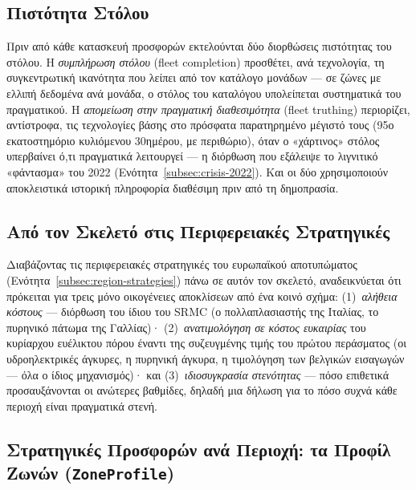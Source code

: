 \subsection{Πιστότητα Στόλου}
\label{subsec:fleet-honesty}

Πριν από κάθε κατασκευή προσφορών εκτελούνται δύο διορθώσεις πιστότητας του στόλου. Η \emph{συμπλήρωση στόλου} (fleet completion) προσθέτει, ανά τεχνολογία, τη συγκεντρωτική ικανότητα που λείπει από τον κατάλογο μονάδων --- σε ζώνες με ελλιπή δεδομένα ανά μονάδα, ο στόλος του καταλόγου υπολείπεται συστηματικά του πραγματικού. Η \emph{απομείωση στην πραγματική διαθεσιμότητα} (fleet truthing) περιορίζει, αντίστροφα, τις τεχνολογίες βάσης στο πρόσφατα παρατηρημένο μέγιστό τους (95ο εκατοστημόριο κυλιόμενου 30ημέρου, με περιθώριο), όταν ο «χάρτινος» στόλος υπερβαίνει ό,τι πραγματικά λειτουργεί --- η διόρθωση που εξάλειψε το λιγνιτικό «φάντασμα» του 2022 (Ενότητα~\ref{subsec:crisis-2022}). Και οι δύο χρησιμοποιούν αποκλειστικά ιστορική πληροφορία διαθέσιμη πριν από τη δημοπρασία.

\subsection{Από τον Σκελετό στις Περιφερειακές Στρατηγικές}
\label{subsec:skeleton-to-regions}

Διαβάζοντας τις περιφερειακές στρατηγικές του ευρωπαϊκού αποτυπώματος (Ενότητα~\ref{subsec:region-strategies}) πάνω σε αυτόν τον σκελετό, αναδεικνύεται ότι πρόκειται για τρεις μόνο οικογένειες αποκλίσεων από ένα κοινό σχήμα: (1)~\emph{αλήθεια κόστους} --- διόρθωση του ίδιου του SRMC (ο πολλαπλασιαστής της Ιταλίας, το πυρηνικό πάτωμα της Γαλλίας)· (2)~\emph{ανατιμολόγηση σε κόστος ευκαιρίας} του κυρίαρχου ευέλικτου πόρου έναντι της συζευγμένης τιμής του πρώτου περάσματος (οι υδροηλεκτρικές άγκυρες, η πυρηνική άγκυρα, η τιμολόγηση των βελγικών εισαγωγών --- όλα ο ίδιος μηχανισμός)· και (3)~\emph{ιδιοσυγκρασία στενότητας} --- πόσο επιθετικά προσαυξάνονται οι ανώτερες βαθμίδες, δηλαδή μια δήλωση για το πόσο συχνά κάθε περιοχή είναι πραγματικά στενή.

\subsection{Στρατηγικές Προσφορών ανά Περιοχή: τα Προφίλ Ζωνών (\texttt{ZoneProfile})}
\label{subsec:zone-profiles}

